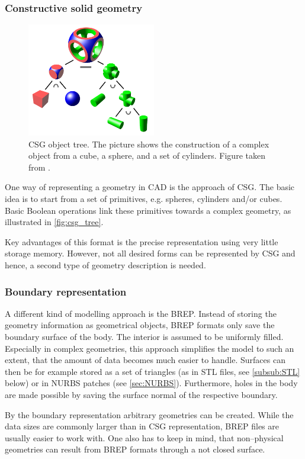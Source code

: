 \subsubsection{Constructive solid geometry}
\begin{figure}
\centering
\includegraphics[width=0.5\textwidth]{Pictures/Csg_tree.png}
\caption{CSG object tree. The picture shows the construction of a complex object from a cube, a sphere, and a set of cylinders. Figure taken from \cite{WikipediaCSG}.}
\label{fig:csg_tree}
\end{figure}
One way of representing a geometry in CAD is the approach of CSG. The basic idea is to start from a set of primitives, e.g. spheres, cylinders and/or cubes. Basic Boolean operations link these primitives towards a complex geometry, as illustrated in \autoref{fig:csg_tree}.

Key advantages of this format is the precise representation using very little storage memory. However, not all desired forms can be represented by CSG and hence, a second type of geometry description is needed. 
\subsubsection{Boundary representation}
A different kind of modelling approach is the BREP. Instead of storing the geometry information as geometrical objects, BREP formats only save the boundary surface of the body. The interior is assumed to be uniformly filled. Especially in complex geometries, this approach simplifies the model to such an extent, that the amount of data becomes much easier to handle. Surfaces can then be for example stored as a set of triangles (as in STL files, see \autoref{subsub:STL} below) or in NURBS patches (see \autoref{sec:NURBS}).
Furthermore, holes in the body are made possible by saving the surface normal of the respective boundary. 

By the boundary representation arbitrary geometries can be created. While the data sizes are commonly larger than in CSG representation, BREP files are usually easier to work with. One also has to keep in mind, that non--physical geometries can result from BREP formats through a not closed surface.
